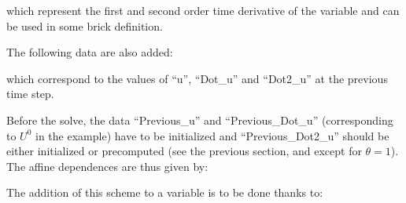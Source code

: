 \documentclass[a4paper,11pt,english]{sphinxmanual}
\begin{document}
which represent the first and second order time derivative of the variable and can be used in some brick definition.

The following data are also added:

\begin{sphinxVerbatim}[commandchars=\\\{\}]
  
\end{sphinxVerbatim}

which correspond to the values of “u”, “Dot\_u”  and “Dot2\_u” at the previous time step.

Before the solve, the data  “Previous\_u” and “Previous\_Dot\_u” (corresponding to \(U^0\) in the example) have to be initialized and “Previous\_Dot2\_u” should be either initialized or precomputed (see the previous section, and except for \(\theta = 1\)). The affine dependences are thus given by:

\begin{sphinxVerbatim}[commandchars=\\\{\}]
      
        
\end{sphinxVerbatim}

The addition of this scheme to a variable is to be done thanks to:

\begin{sphinxVerbatim}[commandchars=\\\{\}]
    
                                   
\end{sphinxVerbatim}
\end{document}
